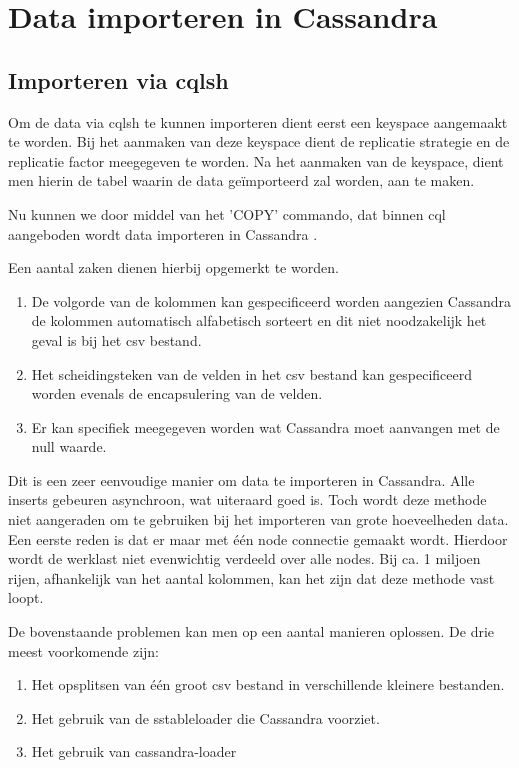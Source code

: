\chapter{Data importeren in Cassandra}
\label{ch:cassandra_import}

\section{Importeren via cqlsh}
Om de data via cqlsh te kunnen importeren dient eerst een keyspace aangemaakt te worden.
Bij het aanmaken van deze keyspace dient de replicatie strategie en de replicatie factor meegegeven te worden.
Na het aanmaken van de keyspace, dient men hierin de tabel waarin de data geïmporteerd zal worden, aan te maken.

Nu kunnen we door middel van het 'COPY' commando, dat binnen cql aangeboden wordt data importeren in Cassandra \citep{Cannon2012Import}.

Een aantal zaken dienen hierbij opgemerkt te worden.

\begin{enumerate}
	\item De volgorde van de kolommen kan gespecificeerd worden aangezien Cassandra de kolommen automatisch alfabetisch sorteert en dit niet noodzakelijk het geval is bij het csv bestand.
	\item Het scheidingsteken van de velden in het csv bestand kan gespecificeerd worden evenals de encapsulering van de velden.
	\item Er kan specifiek meegegeven worden wat Cassandra moet aanvangen met de null waarde.
\end{enumerate}

Dit is een zeer eenvoudige manier om data te importeren in Cassandra.
Alle inserts gebeuren asynchroon, wat uiteraard goed is.
Toch wordt deze methode niet aangeraden om te gebruiken bij het importeren van grote hoeveelheden data.
Een eerste reden is dat er maar met één node connectie gemaakt wordt.
Hierdoor wordt de werklast niet evenwichtig verdeeld over alle nodes.
Bij ca. 1 miljoen rijen, afhankelijk van het aantal kolommen, kan het zijn dat deze methode vast loopt.

De bovenstaande problemen kan men op een aantal manieren oplossen.
De drie meest voorkomende zijn:

\begin{enumerate}
	\item Het opsplitsen van één groot csv bestand in verschillende kleinere bestanden.
	\item Het gebruik van de sstableloader die Cassandra voorziet.
	\item Het gebruik van cassandra-loader
\end{enumerate}

